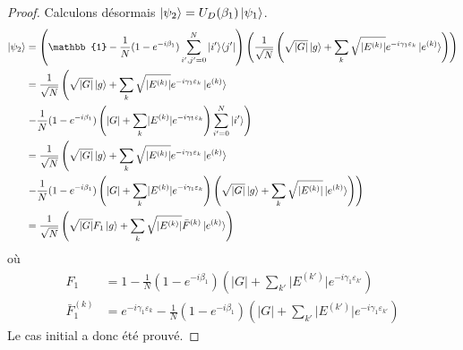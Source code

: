 \begin{proof}
\noindent
Calculons désormais $\ket{\psi_{2}} = U_{D} (\beta_{1})\ket{\psi_{1}}$.
\begin{equation}
\begin{aligned}
    \ket{\psi_{2}} &= \left( \mathbb{1} - \frac{1}{N} (1 - e^{-i\beta_{1}}) \sum_{i',j'=0}^{N} \ket{i'}\!\bra{j'} \right) \left( \frac{1}{ \sqrt{ N }} \left( \sqrt{ \lvert G \rvert  } \ket{g} + \sum_{k} \sqrt{ \lvert E^{(k)} \rvert  } e^{-i \gamma_{1} \varepsilon_{k}}  \ket{e^{(k)}} \right) \right) \\
    &=  \frac{1}{ \sqrt{ N }} \left( \sqrt{ \lvert G \rvert  } \ket{g} + \sum_{k} \sqrt{ \lvert E^{(k)} \rvert  } e^{-i \gamma_{1} \varepsilon_{k}}  \ket{e^{(k)}} \right. \\
    &\left. - \frac{1}{N} (1 - e^{-i\beta_{1}}) \left( \lvert G \rvert + \sum_{k} \lvert E^{(k)} \rvert e^{-i \gamma_{1} \varepsilon_{k}} \right) \sum_{i'=0}^{N} \ket{i'} \right) \\
    &=  \frac{1}{ \sqrt{ N }} \left( \sqrt{ \lvert G \rvert  } \ket{g} + \sum_{k} \sqrt{ \lvert E^{(k)} \rvert  } e^{-i \gamma_{1} \varepsilon_{k}}  \ket{e^{(k)}} \right. \\
    & \left. - \frac{1}{N} (1 - e^{-i\beta_{1}}) \left( \lvert G \rvert + \sum_{k} \lvert E^{(k)} \rvert e^{-i \gamma_{1} \varepsilon_{k}}   \right) \left( \sqrt{ \lvert G \rvert  } \ket{g} + \sum_{k} \sqrt{ \lvert E^{(k)} \rvert } \ket{e^{(k)}} \right) \right) \\
    &= \frac{1}{\sqrt{ N }} \left( \sqrt{ \lvert G \rvert } F_{1} \ket{g} + \sum_{k} \sqrt{ \lvert E^{(k)} \rvert } \bar{F}^{(k)} \ket{e^{(k)}} \right)
\end{aligned}
\end{equation}
où 
\begin{align}
    F_{1} &= 1 - \frac{1}{N} (1 - e^{-i\beta_{1}}) \left(  \lvert G \rvert + \sum_{k'} \lvert E^{(k')} \rvert e^{-i \gamma_{1} \varepsilon_{k'}} \right) \\
    \bar{F}^{(k)}_{1} &= e^{-i\gamma_{1} \varepsilon_{k}} - \frac{1}{N} (1 - e^{-i\beta_{1}}) \left(  \lvert G \rvert + \sum_{k'} \lvert E^{(k')} \rvert e^{-i \gamma_{1} \varepsilon_{k'}} \right)
\end{align}
Le cas initial a donc été prouvé.


\end{proof}
